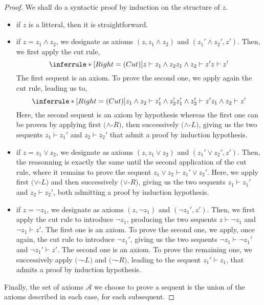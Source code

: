 \documentclass[a4paper, 11pt]{article}
\begin{document}
    \begin{proof}
	    We shall do a syntactic proof by induction on the structure of $z$.
	    \begin{itemize}
		    \item
			    if $z$ is a litteral, then it is straightforward.
		    \item
			    if $z=z_1\wedge z_2$, we designate as axioms
			    $(z, z_1\wedge z_2)$ and $(z_1'\wedge z_2',z')$. Then, we first 
			    apply the cut rule,
			    \[
				\inferrule*[Right=(Cut)]
				{z\vdash z_1\wedge z_2 \\ z_1\wedge z_2\vdash z'}
				{z\vdash z'}
			    \]
			    The first sequent is an axiom. To prove 
			    the second one, we apply again the cut rule, leading us to,
			    \[
				\inferrule*[Right=(Cut)]
				{z_1\wedge z_2\vdash z_1'\wedge z_2'\\ z_1'\wedge z_2'\vdash z'}
				{z_1\wedge z_2\vdash z'}
			    \]
			    Here, the second sequent is an axiom by hypothesis whereas the first one 
			    can be proven by applying
			    first $(\wedge$-$R)$, then successively $(\wedge$-$L)$, giving us the two
			    sequents $z_1\vdash z_1'$ and $z_2\vdash z_2'$ that admit a proof by
			    induction hypothesis.
		    \item
			    if $z=z_1\vee z_2$, we designate as axioms $(z,z_1\vee z_2)$ and 
			    $(z_1'\vee z_2',z')$.
			    Then, the reasonning is exactly the same until the second 
			    application of the cut rule, where it remains to prove the sequent 
			    $z_1\vee z_2\vdash z_1'\vee z_2'$. Here, we apply first $(\vee$-$L)$ and then
			    successively $(\vee$-$R)$, giving us the two sequents $z_1\vdash z_1'$ and
			    $z_2\vdash z_2'$, both admitting a proof by induction hypothesis.
		    \item
			    if $z=\neg z_1$, we designate as axioms $(z,\neg z_1)$ and $(\neg z_1',z')$. 
			    Then, we first apply the cut rule to introduce $\neg z_1$,
			    producing the two sequents $z\vdash \neg z_1$ and $\neg z_1\vdash z'$.
			    The first one is an axiom. To prove the second one, we apply, once again,
			    the cut rule to introduce $\neg z_1'$, giving us the two sequents
			    $\neg z_1\vdash\neg z_1'$ and $\neg z_1'\vdash z'$. The second one is an 
			    axiom. To
			    prove the remaining one, we successively apply $(\neg$-$L)$ and $(\neg$-$R)$,
			    leading to the sequent $z_1'\vdash z_1$, that admits a proof by induction
			    hypothesis.
	    \end{itemize}
	    Finally, the set of axioms $\mathcal{A}$ we choose to prove a sequent is the union of the 
	    axioms described in each case, for each subsequent.
    \end{proof}
\end{document}
